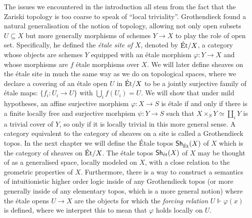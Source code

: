 The issues we encountered in the introduction all stem from the fact that the Zariski topology is too coarse to speak of ``local triviality''. Grothendieck found a natural generalisation of the notion of topology, allowing not only open subsets $U \subseteq X$ but more generally morphisms of schemes $Y \to X$ to play the role of open set. Specifically, he defined the \textit{\'etale site of $X$}, denoted by $\text{\'Et}/X$, a category whose objects are schemes $Y$ equipped with an \'etale morphism $\varphi \colon Y \to X$ and whose morphisms are $f$ \'etale morphisms over $X$. We will later define sheaves on the \'etale site in much the same way as we do on topological spaces, where we declare a covering of an \'etale open $U$ in $\text{\'Et}/X$ to be a jointly surjective family of \'etale maps: $\{f_i \colon U_i \to U\}$ with $\bigcup_i f(U_i) = U$. We will show that under mild hypotheses, an affine surjective morphism $\varphi \colon X \to S$ is \'etale if and only if there is a finite locally free and surjective morhpism $\psi \colon Y \to S$ such that $X \times_S Y \simeq \coprod_i Y$ is a trivial cover of $Y$, so only if it is locally trivial in this more general sense. A category equivalent to the category of sheaves on a site is called a Grothendieck topos. In the next chapter we will define the \'Etale topos $\operatorname{\mathsf{Sh}}_{\text{\'Et}}(X)$ of $X$ which is the category of sheaves on $\text{\'Et}/X$. The \'etale topos $\mathsf{Sh}_{\text{\'et}}(X)$ of $X$ may be thought of as a generalised space, locally modeled on $X$, with a close relation to the geometric properties of $X$. Furthermore, there is a way to construct a semantics of intuitionistic higher order logic inside of any Grothendieck topos (or more generally inside of any elementary topos, which is a more general notion) where the \'etale opens $U \to X$ are the objects for which the \textit{forcing relation} $U \Vdash \varphi(x)$ is defined, where we interpret this to mean that $\varphi$ holds locally on $U$.





